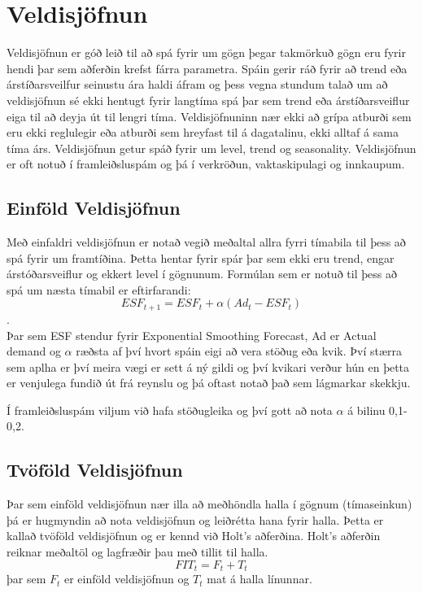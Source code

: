 
\section{Veldisjöfnun}
Veldisjöfnun er góð leið til að spá fyrir um gögn þegar takmörkuð gögn eru fyrir hendi þar sem aðferðin krefst fárra parametra. Spáin gerir ráð fyrir að trend eða árstíðarsveilfur seinustu ára haldi áfram og þess vegna stundum talað um að veldisjöfnun sé ekki hentugt fyrir langtíma spá þar sem trend eða árstíðarsveiflur eiga til að deyja út til lengri tíma. Veldisjöfnuninn nær ekki að grípa atburði sem eru ekki reglulegir eða atburði sem hreyfast til á dagatalinu, ekki alltaf á sama tíma árs. Veldisjöfnun getur spáð fyrir um level, trend og seasonality.  Veldisjöfnun er oft notuð í framleiðsluspám og þá í verkröðun, vaktaskipulagi og innkaupum.

\subsection{Einföld Veldisjöfnun}
Með einfaldri veldisjöfnun er notað vegið meðaltal allra fyrri tímabila til þess að spá fyrir um framtíðina. Þetta hentar fyrir spár þar sem ekki eru trend, engar árstóðarsveiflur og ekkert level í gögnunum. Formúlan sem er notuð til þess að spá um næsta tímabil er eftirfarandi: \\

$$ESF_{t+1} = ESF_t + \alpha ( Ad_t - ESF_t )$$. \\
Þar sem ESF stendur fyrir Exponential Smoothing Forecast, Ad er Actual demand og $\alpha$ ræðsta af því hvort spáin eigi að vera stöðug eða kvik. Því stærra sem aplha er  því meira vægi er sett á ný gildi og því kvikari verður hún en þetta er venjulega fundið út frá reynslu og þá oftast notað það sem lágmarkar skekkju.

Í framleiðsluspám viljum við hafa stöðugleika og því gott að nota $\alpha$ á bilinu 0,1-0,2.

\subsection{Tvöföld Veldisjöfnun}
Þar sem einföld veldisjöfnun nær illa að meðhöndla halla í gögnum (tímaseinkun) þá er hugmyndin að nota veldisjöfnun og leiðrétta hana fyrir halla. Þetta er kallað tvöföld veldisjöfnun og er kennd við Holt’s aðferðina. Holt’s aðferðin reiknar meðaltöl og lagfræðir þau með tillit til halla.
$$FIT_t = F_t + T_t$$ þar sem $F_t$ er einföld veldisjöfnun og $T_t$ mat á halla línunnar.

